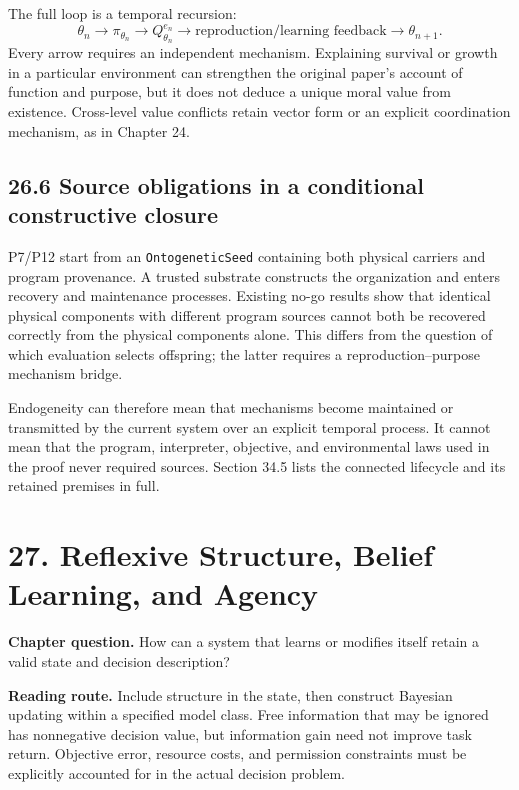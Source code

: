 \documentclass[
  english,
  11pt,
  oneside]{book}
\begin{document}
The full loop is a temporal recursion: \[\theta_n \to \pi_{\theta_n}\to Q_{\theta_n}^{e_n}
\to\text{reproduction/learning feedback}\to\theta_{n+1}.\] Every arrow requires an independent mechanism. Explaining survival or growth in a particular environment can strengthen the original paper's account of function and purpose, but it does not deduce a unique moral value from existence. Cross-level value conflicts retain vector form or an explicit coordination mechanism, as in Chapter 24.

\section{26.6 Source obligations in a conditional constructive closure}\label{source-obligations-in-a-conditional-constructive-closure}

P7/P12 start from an \nolinkurl{OntogeneticSeed} containing both physical carriers and program provenance. A trusted substrate constructs the organization and enters recovery and maintenance processes. Existing no-go results show that identical physical components with different program sources cannot both be recovered correctly from the physical components alone. This differs from the question of which evaluation selects offspring; the latter requires a reproduction--purpose mechanism bridge.

Endogeneity can therefore mean that mechanisms become maintained or transmitted by the current system over an explicit temporal process. It cannot mean that the program, interpreter, objective, and environmental laws used in the proof never required sources. Section 34.5 lists the connected lifecycle and its retained premises in full.

\chapter{27. Reflexive Structure, Belief Learning, and Agency}\label{ch-27}

\textbf{Chapter question.} How can a system that learns or modifies itself retain a valid state and decision description?

\textbf{Reading route.} Include structure in the state, then construct Bayesian updating within a specified model class. Free information that may be ignored has nonnegative decision value, but information gain need not improve task return. Objective error, resource costs, and permission constraints must be explicitly accounted for in the actual decision problem.
\end{document}
